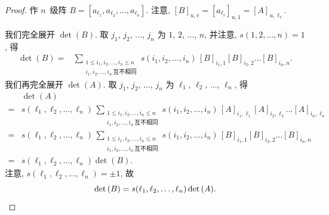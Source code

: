 \documentclass[../libro.tex]{subfiles}
\begin{document}
\begin{proof}
    作 \(n\)~级阵
    \(
        B = [a_{\ell_1}, a_{\ell_2}, \dots, a_{\ell_n}].
    \)
    注意, \([B]_{u,v} = [a_{\ell_v}]_{u,1} = [A]_{u,\ell_v}\).

    我们完全展开 \(\det {(B)}\).
    取 \(j_1\), \(j_2\), \(\dots\), \(j_n\)
    为 \(1\), \(2\), \(\dots\), \(n\),
    并注意, \(s(1, 2, \dots, n) = 1\),
    得
    \begin{align*}
        \det {(B)}
        = {} &
        \sum_{\substack{
                1 \leq i_1, i_2, \dots, i_n \leq n \\
                i_1, i_2, \dots, i_n\,\text{互不相同}
        }}
        {s(i_1, i_2, \dots, i_n)\,
            [B]_{i_1,1} [B]_{i_2,2}
        \dots [B]_{i_n,n}}.
    \end{align*}
    我们再完全展开 \(\det {(A)}\).
    取 \(j_1\), \(j_2\), \(\dots\), \(j_n\)
    为 \(\ell_1\), \(\ell_2\), \(\dots\), \(\ell_n\),
    得
    \begin{align*}
        & \det {(A)}
        \\
        = {} &
        s(\ell_1, \ell_2, \dots, \ell_n)\,
        \sum_{\substack{
                1 \leq i_1, i_2, \dots, i_n \leq n \\
                i_1, i_2, \dots, i_n\,\text{互不相同}
        }}
        {s(i_1, i_2, \dots, i_n)\,
            [A]_{i_1,\ell_1} [A]_{i_2,\ell_2}
        \dots [A]_{i_n,\ell_n}}
        \\
        = {} &
        s(\ell_1, \ell_2, \dots, \ell_n)\,
        \sum_{\substack{
                1 \leq i_1, i_2, \dots, i_n \leq n \\
                i_1, i_2, \dots, i_n\,\text{互不相同}
        }}
        {s(i_1, i_2, \dots, i_n)\,
            [B]_{i_1,1} [B]_{i_2,2}
        \dots [B]_{i_n,n}}
        \\
        = {} & s(\ell_1, \ell_2, \dots, \ell_n)
        \det {(B)}.
    \end{align*}
    注意, \(s(\ell_1, \ell_2, \dots, \ell_n) = \pm 1\),
    故
    \begin{equation*}
        \det {(B)}
        = s(\ell_1, \ell_2, \dots, \ell_n)
        \det {(A)}.
        \qedhere
    \end{equation*}
\end{proof}
\end{document}
